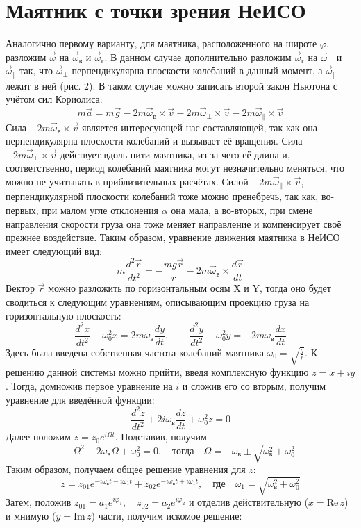 \documentclass[a4paper, 10pt]{article}%
\begin{document}
\newpage
\section*{Маятник с точки зрения НеИСО}
Аналогично первому варианту, для маятника, расположенного на широте $\varphi$, разложим $\vec{\omega}$ на $\vec{\omega}_{\text{в}}$ и $\vec{\omega}_{\text{г}}$. В данном случае дополнительно разложим $\vec{\omega}_{\text{г}}$ на $\vec{\omega}_{\text{$\bot$}}$ и $\vec{\omega}_{\text{$\parallel $}}$ так, что $\vec{\omega}_{\text{$\bot$}}$ перпендикулярна плоскости колебаний в данный момент, а $\vec{\omega}_{\text{$\parallel $}}$ лежит в ней (рис. 2).
В таком случае можно записать второй закон Ньютона с учётом сил Кориолиса:
\[ m\vec{a} = m\vec{g} - 2m\vec{\omega}_{\text{в}}\times\vec{v} -2m\vec{\omega}_{\text{$\bot$}}\times\vec{v} - 2m\vec{\omega}_{\text{$\parallel $}}\times\vec{v}  \]
Сила $-2m\vec{\omega}_{\text{в}}\times\vec{v}$ является интересующей нас составляющей, так как она перпендикулярна плоскости колебаний и вызывает её вращения. Сила $-2m\vec{\omega}_{\text{$\bot$}}\times\vec{v}$ действует вдоль нити маятника, из-за чего её длина и, соответственно, период колебаний маятника могут незначительно меняться, что можно не учитывать в приблизительных расчётах.
Силой $- 2m\vec{\omega}_{\text{$\parallel $}}\times\vec{v}$, перпендикулярной плоскости колебаний тоже можно пренебречь, так как, во-первых, при малом угле отклонения $\alpha$ она мала, а во-вторых, при смене направления скорости груза она тоже меняет направление и компенсирует своё прежнее воздействие.
Таким образом, уравнение движения маятника в НеИСО имеет следующий вид:
\[m\frac{d^2\vec{r}}{dt^2} = -\frac{mg\vec{r}}{r} - 2m\vec{\omega}_{\text{в}}\times\frac{d\vec{r}}{dt}  \]
Вектор $\vec{r}$ можно разложить по горизонтальным осям X и Y, тогда оно будет сводиться к следующим уравнениям, описывающим проекцию груза на горизонтальную плоскость:
\[\frac{d^2x}{dt^2} + \omega_0^2x=2m{\omega}_{\text{в}}\frac{dy}{dt},  \qquad \frac{d^2y}{dt^2} + \omega_0^2y=-2m{\omega}_{\text{в}}\frac{dx}{dt}\]
Здесь была введена собственная частота колебаний маятника $\omega_0 = \sqrt{\frac{g}{r}}$. К решению данной системы можно прийти, введя комплексную функцию $z=x+iy$. Тогда, домножив первое уравнение на $i$ и сложив его со вторым, получим уравнение для введённой функции:
\[\frac{d^2z}{dt^2} + 2i{\omega}_{\text{в}}\frac{dz}{dt}+\omega_0^2z=0  \]
Далее положим $z=z_0e^{i\Omega t}$. Подставив, получим
\[-\Omega^2-2{\omega}_{\text{в}}\Omega+\omega_0^2=0, \quad \text{тогда} \quad \Omega=-{\omega}_{\text{в}}\pm\sqrt{{\omega}_{\text{в}}^2+\omega_0^2}\]
Таким образом, получаем общее решение уравнения для $z$:
\[z=z_{01}e^{-i{\omega}_{\text{в}}t-i\omega_1t}+z_{02}e^{-i{\omega}_{\text{в}}t+i\omega_1t}, \quad \text{где} \quad \omega_1=\sqrt{{\omega}_{\text{в}}^2+\omega_0^2}\]
Затем, положив $z_{01}=a_1e^{i\varphi_1}, \quad z_{02}=a_2e^{i\varphi_2}$ и отделив действительную ($x=\text{Re}\,z$) и мнимую ($y=\text{Im}\,z$) части, получим искомое решение:
\end{document}
